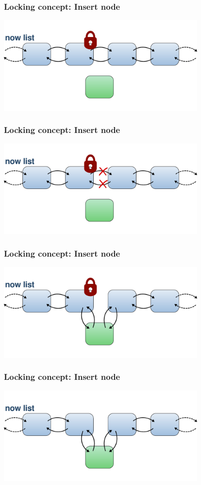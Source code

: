 \documentclass{beamer}
\begin{document}
\begin{frame}
\frametitle{Locking concept: Insert node}
\begin{center}
	\includegraphics[height=140pt]{insert2.pdf}
\end{center}
\end{frame}

\begin{frame}
\frametitle{Locking concept: Insert node}
\begin{center}
	\includegraphics[height=140pt]{insert3.pdf}
\end{center}
\end{frame}

\begin{frame}
\frametitle{Locking concept: Insert node}
\begin{center}
	\includegraphics[height=140pt]{insert4.pdf}
\end{center}
\end{frame}

\begin{frame}
\frametitle{Locking concept: Insert node}
\begin{center}
	\includegraphics[height=140pt]{insert5.pdf}
\end{center}
\end{frame}
\end{document}
